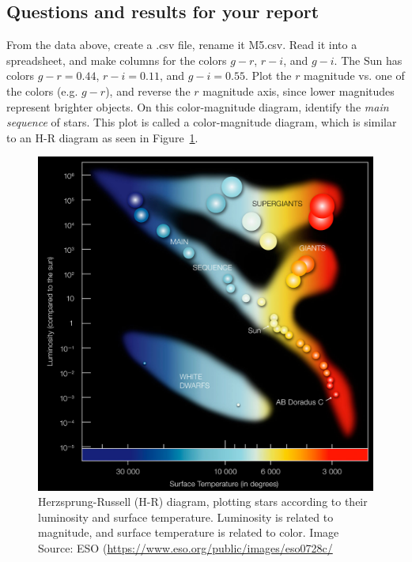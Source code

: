 \subsection{Questions and results for your report}

\begin{steps}
	\item From the data above, create a .csv file, rename it M5.csv. Read it into
	a spreadsheet, and make columns for the colors $g - r$, $r - i$, and $g - i$. The Sun has
	colors $g - r = 0.44$, $r - i = 0.11$, and $g - i = 0.55$. Plot the $r$ magnitude vs. one of the colors (e.g.
	$g - r$), and reverse the $r$ magnitude axis, since lower magnitudes represent brighter objects. On this color-magnitude diagram, identify
	the \textit{main sequence} of stars. This plot is called a color-magnitude diagram, which is similar to an H-R diagram as seen in Figure~\ref{gc:fig:hr}.
\end{steps}

\begin{figure}
	\includegraphics[width=\textwidth]{globular-cluster/eso0728c}
	\caption{Herzsprung-Russell (H-R) diagram, plotting stars according to their luminosity and surface temperature. Luminosity is related to magnitude, and surface temperature is related to color. Image Source: ESO (\url{https://www.eso.org/public/images/eso0728c/}}\label{gc:fig:hr}
\end{figure}

